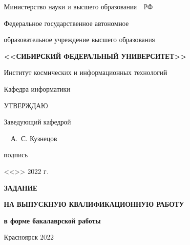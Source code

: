 \begin{spacing}{1}
    \setlength{\parindent}{0cm}

    \centerline{Министерство науки и высшего образования~~РФ}

    \centerline{\small Федеральное государственное автономное}

    \centerline{\small образовательное учреждение высшего образования}

    \centerline{\small\textbf{\MakeUppercase{<<Сибирский Федеральный Университет>>}}}

    \vspace{8pt}

    \centerline{{Институт космических и информационных технологий}}

    \centerline{{Кафедра информатики}}

    \vspace{10pt}

    \hfill\begin{minipage}{5.5cm}
        УТВЕРЖДАЮ

        Заведующий кафедрой

        \uline{\hfill}~~А.~С. Кузнецов

        \vspace{-4pt}
        {\footnotesize \hspace{2.1ex} подпись}

        <<\uline{\hspace{3ex}}>> \uline{\hspace{9ex}} 2022 г.
    \end{minipage}

    \vfill

    \centerline{\bf ЗАДАНИЕ}
    \centerline{\bf НА ВЫПУСКНУЮ КВАЛИФИКАЦИОННУЮ РАБОТУ}
    \centerline{\bf в форме бакалаврской работы}

    \vfill
    \vfill
    \vfill

    \centerline{Красноярск 2022}

\end{spacing}

\thispagestyle{empty}

\clearpage

